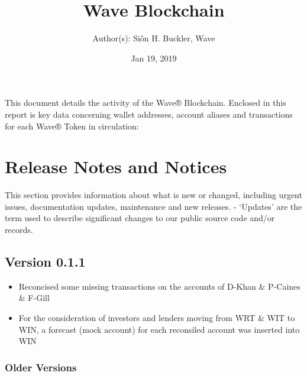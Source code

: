 \documentclass[letterpaper,10pt,openany,oneside,english]{sphinxmanual}
\title{Wave Blockchain}
\date{Jan 19, 2019}
\author{Author(s): Siôn H. Buckler, Wave}
\begin{document}
\maketitle
\sphinxtableofcontents
{}\label{\detokenize{index::doc}}


This document details the activity of the Wave® Blockchain.
Enclosed in this report is key data concerning wallet addresses, account aliases and transactions for each Wave® Token in circulation:


\chapter{Release Notes and Notices}
\label{\detokenize{releasenotes:release-notes-and-notices}}\label{\detokenize{releasenotes::doc}}
This section provides information about what is new or changed, including urgent issues, documentation updates, maintenance and new releases.
- ‘Updates’ are the term used to describe significant changes to our public source code and/or records.


\section{Version 0.1.1}
\label{\detokenize{releasenotes:version-0-1-1}}\begin{itemize}
\item {} 
Reconcised some missing transactions on the accounts of D-Khan \& P-Caines \& F-Gill

\item {} 
For the consideration of investors and lenders moving from WRT \& WIT to WIN, a forecast (mock account) for each reconsiled account was inserted into WIN

\end{itemize}


\subsection{Older Versions}
\label{\detokenize{releasenotes:older-versions}}
\end{document}
